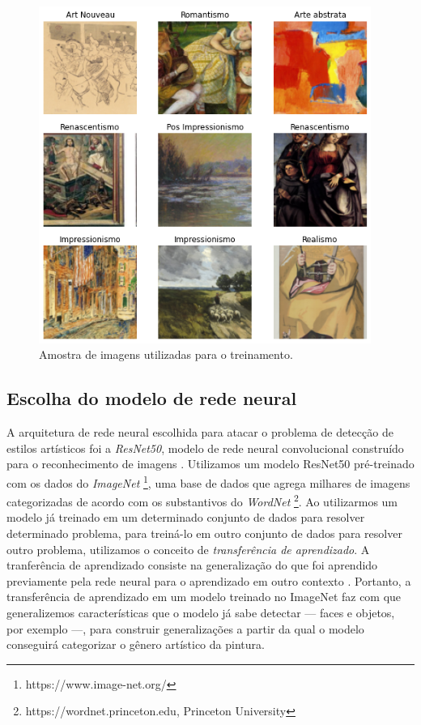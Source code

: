 \documentclass[12pt, a4paper]{article}
\begin{document}
\begin{figure}[H]
	\centering
	\includegraphics[width=\textwidth, height=11cm, keepaspectratio=true]{fig/datasample}
	\caption{Amostra de imagens utilizadas para o treinamento.}
\end{figure}

\subsection{Escolha do modelo de rede neural}
A arquitetura de rede neural escolhida para atacar o problema de detecção de estilos artísticos foi a \emph{ResNet50}, modelo de rede neural convolucional construído para o reconhecimento de imagens \cite{he2015deep}. Utilizamos um modelo ResNet50 pré-treinado com os dados do \emph{ImageNet} \footnote{https://www.image-net.org/}, uma base de dados que agrega milhares de imagens categorizadas de acordo com os substantivos do \emph{WordNet} \footnote{https://wordnet.princeton.edu, Princeton University}. Ao utilizarmos um modelo já treinado em um determinado conjunto de dados para resolver determinado problema, para treiná-lo em outro conjunto de dados para resolver outro problema, utilizamos o conceito de \emph{transferência de aprendizado}. A tranferência de aprendizado consiste na generalização do que foi aprendido previamente pela rede neural para o aprendizado em outro contexto \cite[p.534]{Goodfellow-et-al-2016}. Portanto,
a transferência de aprendizado em um modelo treinado no ImageNet faz com que generalizemos características que o modelo já sabe detectar --- faces e objetos, por exemplo ---, para construir generalizações a partir da qual o modelo conseguirá categorizar o gênero artístico da pintura.
\end{document}
